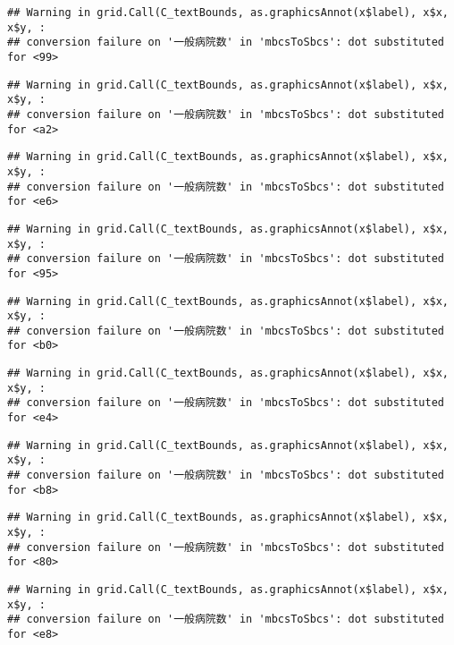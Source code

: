\documentclass[
]{article}
\begin{document}
\begin{verbatim}
## Warning in grid.Call(C_textBounds, as.graphicsAnnot(x$label), x$x, x$y, :
## conversion failure on '一般病院数' in 'mbcsToSbcs': dot substituted for <99>
\end{verbatim}

\begin{verbatim}
## Warning in grid.Call(C_textBounds, as.graphicsAnnot(x$label), x$x, x$y, :
## conversion failure on '一般病院数' in 'mbcsToSbcs': dot substituted for <a2>
\end{verbatim}

\begin{verbatim}
## Warning in grid.Call(C_textBounds, as.graphicsAnnot(x$label), x$x, x$y, :
## conversion failure on '一般病院数' in 'mbcsToSbcs': dot substituted for <e6>
\end{verbatim}

\begin{verbatim}
## Warning in grid.Call(C_textBounds, as.graphicsAnnot(x$label), x$x, x$y, :
## conversion failure on '一般病院数' in 'mbcsToSbcs': dot substituted for <95>
\end{verbatim}

\begin{verbatim}
## Warning in grid.Call(C_textBounds, as.graphicsAnnot(x$label), x$x, x$y, :
## conversion failure on '一般病院数' in 'mbcsToSbcs': dot substituted for <b0>
\end{verbatim}

\begin{verbatim}
## Warning in grid.Call(C_textBounds, as.graphicsAnnot(x$label), x$x, x$y, :
## conversion failure on '一般病院数' in 'mbcsToSbcs': dot substituted for <e4>
\end{verbatim}

\begin{verbatim}
## Warning in grid.Call(C_textBounds, as.graphicsAnnot(x$label), x$x, x$y, :
## conversion failure on '一般病院数' in 'mbcsToSbcs': dot substituted for <b8>
\end{verbatim}

\begin{verbatim}
## Warning in grid.Call(C_textBounds, as.graphicsAnnot(x$label), x$x, x$y, :
## conversion failure on '一般病院数' in 'mbcsToSbcs': dot substituted for <80>
\end{verbatim}

\begin{verbatim}
## Warning in grid.Call(C_textBounds, as.graphicsAnnot(x$label), x$x, x$y, :
## conversion failure on '一般病院数' in 'mbcsToSbcs': dot substituted for <e8>
\end{verbatim}
\end{document}
